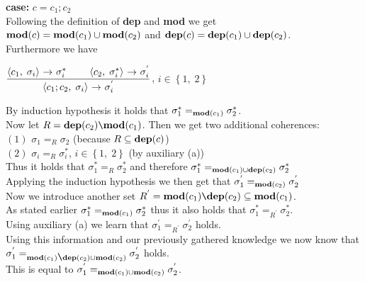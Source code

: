 \documentclass[12pt]{scrartcl}
\newcommand{\eRelation}[2]{$\dfrac{\text{#1}}{\text{#2}}$}
\newcommand{\eState}[2]{$\left\langle \text{#1},\; \text{#2}\right\rangle$}
\newcommand{\eRule}[3]{\eState{#1}{#2} $\rightarrow$ #3}
\newcommand{\Mod}[0]{\text{\textbf{mod}}}
\newcommand{\dep}[0]{\text{\textbf{dep}}}
\begin{document}
	\indent\indent \textbf{case:} $c=${\boldmath $c_{1};c_{2}$}\\
	
	\indent\indent Following the definition of \textbf{dep} and \textbf{mod} we get\\\indent\indent $\Mod(c)=\Mod(c_{1})\cup \Mod(c_2)$ and $\dep(c)=\dep(c_{1})\cup \dep(c_{2})$.\\
	
	\indent\indent Furthermore we have
	\begin{center}
		\eRelation
			{\eRule{$c_{1}$}{$\sigma_{i}$}{$\sigma_{i}^{*}$} \qquad \eRule{$c_{2}$}{$\sigma_{i}^{*}$}{$\sigma_{i}^{'}$}}
			{\eRule{$c_{1};c_{2}$}{$\sigma_{i}$}{$\sigma_{i}^{'}$}}, $i\in \left\lbrace 1,\; 2\right\rbrace$
	\end{center}
	
	\indent\indent By induction hypothesis it holds that $\sigma_{1}^{*}=_{\Mod(c_{1})}\sigma_{2}^{*}$.\\
	\indent\indent Now let $R=\dep(c_{2})\verb|\|\Mod(c_{1})$. Then we get two additional coherences:\\
	\indent\indent\indent $(1)$ \quad $\sigma_{1}=_{R}\sigma_{2}$ (because $R\subseteq \dep(c)$)\\
	\indent\indent\indent $(2)$ \quad $\sigma_{i}=_{R}\sigma_{i}^{*}$, $i\in \left\lbrace 1,\; 2\right\rbrace$ (by auxiliary (a))\\
	\indent\indent Thus it holds that $\sigma_{1}^{*}=_{R}\sigma_{2}^{*}$ and therefore $\sigma_{1}^{*}=_{\Mod(c_1)\cup\dep(c_2)}\sigma_{2}^{*}$\\
	\indent\indent Applying the induction hypothesis we then get that $\sigma_{1}^{'}=_{\Mod(c_2)}\sigma_{2}^{'}$\\
	\indent\indent Now we introduce another set $R^{'}=\Mod(c_{1})\verb|\|\dep(c_{2})\subseteq\Mod(c_{1})$.\\
	\indent\indent As stated earlier $\sigma_{1}^{*}=_{\Mod(c_{1})}\sigma_{2}^{*}$ thus it also holds that $\sigma_{1}^{*}=_{R^{'}}\sigma_{2}^{*}$.\\
	\indent\indent Using auxiliary (a) we learn that $\sigma_{1}^{'}=_{R^{'}}\sigma_{2}^{'}$ holds.\\
	\indent\indent Using this information and our previously gathered knowledge we now know \indent\indent that $\sigma_{1}^{'}=_{\Mod(c_{1})\verb|\|\dep(c_{2})\cup\Mod(c_{2})}\sigma_{2}^{'}$ holds.\\
	\indent\indent This is equal to $\sigma_{1}^{'}=_{\Mod(c_{1})\cup\Mod(c_{2})}\sigma_{2}^{'}$.\\
	
\end{document}
